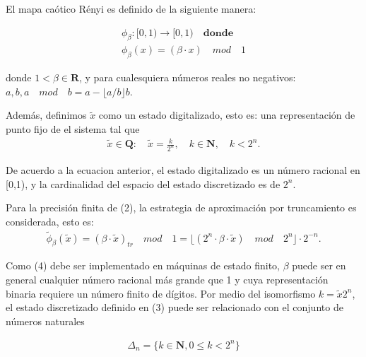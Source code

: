 \documentclass{llncs}
\begin{document}
El mapa caótico Rényi es definido de la siguiente manera:

\begin{equation}
\begin{aligned}
\phi_{\beta}:[0,1) \longrightarrow [0,1) \quad \textbf{donde}\\
\phi_{\beta}(x)=(\beta \cdot x)\quad  mod \quad 1
\end{aligned}
\end{equation}

donde $1 < \beta \in \mathbf{R}$, y para cualesquiera números reales no negativos: $a, b, a \quad mod \quad b= a- \lfloor a/b \rfloor b$.

Además, definimos $\tilde{x}$ como un estado digitalizado, esto es: una representación de punto fijo de el sistema tal que 
\begin{equation}
\begin{aligned}
\tilde{x} \in \mathbf{Q}: \quad \tilde{x}= \frac{k}{2^{n}}, \quad k \in \mathbf{N}, \quad k < 2^{n}.
\end{aligned}
\end{equation}

De acuerdo a la ecuacion anterior, el estado digitalizado es un número racional en [0,1), y la cardinalidad del espacio del estado discretizado es de $2^{n}$.

Para la precisión finita de (2), la estrategia de aproximación por truncamiento es considerada, esto es:
\begin{equation}
\begin{aligned}
\tilde{\phi}_{\beta}(\tilde{x})= (\beta \cdot \tilde{x})_{tr} \quad mod \quad 1=
\lfloor (2^{n}\cdot \beta \cdot \tilde{x} )\quad mod \quad 2^{n}  \rfloor \cdot 2^{-n}.
\end{aligned}
\end{equation}

Como (4) debe ser implementado en máquinas de estado finito, $\beta$ puede ser en general cualquier número racional más grande que 1 y cuya representación binaria requiere un número finito de dígitos. Por medio del isomorfismo $k = \tilde{x}2^{n}$, el estado discretizado definido en (3) puede ser relacionado con el conjunto de números naturales 

\begin{equation}
\begin{aligned}
\Delta _{n}= \lbrace k \in \mathbf{N}, 0 \leq k < 2^{n}  \rbrace
\end{aligned}
\end{equation}
\end{document}
